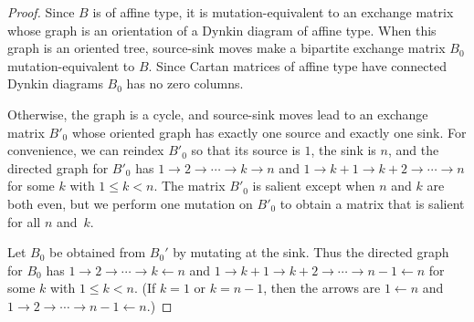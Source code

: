 \documentclass{amsart}
\theoremstyle{definition}
\theoremstyle{remark}
\numberwithin{equation}{section}
\newcommand{\0}{{\mathbf{0}}}
\begin{document}
\begin{proof}
Since $B$ is of affine type, it is mutation-equivalent to an exchange matrix whose graph is an orientation of a Dynkin diagram of affine type.
When this graph is an oriented tree, source-sink moves make a bipartite exchange matrix $B_0$ mutation-equivalent to $B$.
Since Cartan matrices of affine type have connected Dynkin diagrams $B_0$ has no zero columns.

Otherwise, the graph is a cycle, and source-sink moves lead to an exchange matrix $B'_0$ whose oriented graph has exactly one source and exactly one sink.
For convenience, we can reindex $B'_0$ so that its source is $1$, the sink is $n$, and the directed graph for $B'_0$ has ${1\to2\to\cdots\to k\to n}$ and $1\to k+1\to k+2\to\cdots\to n$ for some $k$ with $1\le k<n$.
The matrix $B'_0$ is salient except when $n$ and $k$ are both even, but we perform one mutation on $B'_0$ to obtain a matrix that is salient for all $n$ and~$k$.

Let $B_0$ be obtained from $B_0'$ by mutating at the sink.
Thus the directed graph for $B_0$ has ${1\to2\to\cdots\to k\leftarrow n}$ and $1\to k+1\to k+2\to\cdots\to n-1\leftarrow n$ for some $k$ with $1\le k<n$.
(If $k=1$ or $k=n-1$, then the  arrows are $1\leftarrow n$ and $1\to2\to\cdots\to n-1\leftarrow n$.)


\end{proof}
\end{document}
